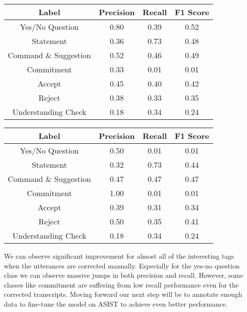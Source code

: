 \begin{center}
\begin{tabular}{||c c c c||}
 \hline
 Label & Precision & Recall & F1 Score\\ [0.5ex]
 \hline\hline
 Yes/No Question & 0.80 & 0.39  & 0.52\\
 \hline
 Statement & 0.36 & 0.73 & 0.48\\
 \hline
 Command \& Suggestion & 0.52 & 0.46 & 0.49\\
 \hline
 Commitment & 0.33 & 0.01 & 0.01\\
 \hline
 Accept & 0.45 & 0.40 &  0.42 \\
 \hline
  Reject & 0.38 & 0.33 & 0.35\\
 \hline
  Understanding Check & 0.18 & 0.34 & 0.24\\
 \hline
\end{tabular}
\end{center}

\begin{center}
\begin{tabular}{||c c c c||}
 \hline
 Label & Precision & Recall & F1 Score\\ [0.5ex]
 \hline\hline
 Yes/No Question & 0.50 & 0.01 & 0.01\\
 \hline
 Statement & 0.32 & 0.73 & 0.44\\
 \hline
 Command \& Suggestion & 0.47 & 0.47 & 0.47\\
 \hline
 Commitment & 1.00 & 0.01 & 0.01\\
 \hline
 Accept & 0.39 & 0.31 &  0.34 \\
 \hline
  Reject & 0.50 & 0.35 & 0.41\\
 \hline
  Understanding Check & 0.18 & 0.34 & 0.24\\
 \hline
\end{tabular}
\end{center}

We can observe significant improvement for almost all of the interesting tags when the
utterances are corrected manually. Especially for the yes-no question class we can 
observe massive jumps in both precision and recall. However, some classes like commitment
are suffering from low recall performance even for the corrected transcripts. Moving forward
our next step will be to annotate enough data to fine-tune the model on ASIST to achieve
even better performance.
